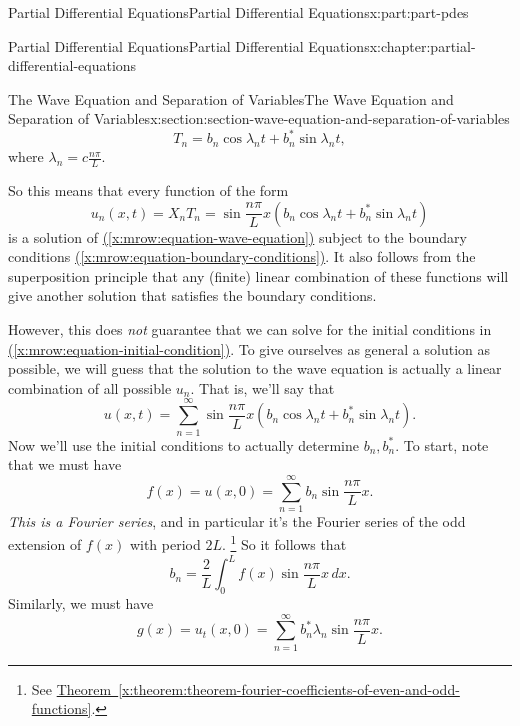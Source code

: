 \documentclass[twoside,10pt,]{book}
\newcommand{\xreffont}{\relax}
\numberwithin{equation}{part}
\begin{document}
\begin{partptx}{Partial Differential Equations}{}{Partial Differential Equations}{}{}{x:part:part-pdes}
\begin{chapterptx}{Partial Differential Equations}{}{Partial Differential Equations}{}{}{x:chapter:partial-differential-equations}
\begin{sectionptx}{The Wave Equation and Separation of Variables}{}{The Wave Equation and Separation of Variables}{}{}{x:section:section-wave-equation-and-separation-of-variables}
\begin{equation*}
T_{n} = b_{n}\cos\lambda_{n}t+b^{*}_{n}\sin\lambda_{n}t,
\end{equation*}
where \(\lambda_{n} = c\frac{n\pi}{L}\).%
\par
So this means that every function of the form%
\begin{equation*}
u_{n}(x,t) = X_{n}T_{n} = \sin\frac{n\pi}{L}x\left(b_{n}\cos\lambda_{n}t+b^{*}_{n}\sin\lambda_{n}t\right)
\end{equation*}
is a solution of \hyperref[x:mrow:equation-wave-equation]{({\xreffont\ref{x:mrow:equation-wave-equation}})} subject to the boundary conditions \hyperref[x:mrow:equation-boundary-conditions]{({\xreffont\ref{x:mrow:equation-boundary-conditions}})}. It also follows from the superposition principle that any (finite) linear combination of these functions will give another solution that satisfies the boundary conditions.%
\par
However, this does \emph{not} guarantee that we can solve for the initial conditions in \hyperref[x:mrow:equation-initial-condition]{({\xreffont\ref{x:mrow:equation-initial-condition}})}. To give ourselves as general a solution as possible, we will guess that the solution to the wave equation is actually a linear combination of all possible \(u_{n}\). That is, we'll say that%
%
\begin{equation*}
u(x,t) = \sum_{n=1}^{\infty}\sin\frac{n\pi}{L}x\left(b_{n}\cos\lambda_{n}t+b^{*}_{n}\sin\lambda_{n}t\right).
\end{equation*}
Now we'll use the initial conditions to actually determine \(b_{n},b^{*}_{n}\). To start, note that we must have%
\begin{equation*}
f(x) = u(x,0) = \sum_{n=1}^{\infty}b_{n}\sin\frac{n\pi}{L}x.
\end{equation*}
\emph{This is a Fourier series}, and in particular it's the Fourier series of the odd extension of \(f(x)\) with period \(2L\). \footnote{See \hyperref[x:theorem:theorem-fourier-coefficients-of-even-and-odd-functions]{Theorem~{\xreffont\ref{x:theorem:theorem-fourier-coefficients-of-even-and-odd-functions}}}.\label{g:fn:idp105548816944416}} So it follows that%
%
\begin{equation*}
b_{n} = \frac{2}{L}\int_{0}^{L}f(x)\sin\frac{n\pi}{L}x\,dx.
\end{equation*}
Similarly, we must have%
\begin{equation*}
g(x) = u_{t}(x,0) = \sum_{n=1}^{\infty}b_{n}^{*}\lambda_{n}\sin\frac{n\pi}{L}x.
\end{equation*}

\end{sectionptx}
\end{chapterptx}
\end{partptx}
\end{document}
